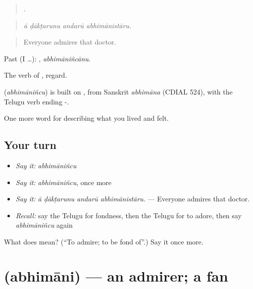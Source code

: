 \begin{quote}
   .
\end{quote}

\begin{quote}
\emph{ā ḍākṭarunu andarū abhimānistāru.}
\end{quote}

\begin{quote}
Everyone admires that doctor.
\end{quote}

Past (I …): , \emph{abhimāniñcānu}.

The verb of , regard.

\begin{cousinweb}
\textbf{} (\emph{abhimāniñcu}) is built on , from Sanskrit \emph{abhimāna} (CDIAL 524), with the Telugu verb ending -.
\end{cousinweb}

\begin{grammarlens}[title={What you've built}]
One more word for describing what you lived and felt.
\end{grammarlens}

\subsection*{Your turn}
\begin{itemize}
\raggedright
  \item \emph{Say it:} \emph{abhimāniñcu}
  \item \emph{Say it:} \emph{abhimāniñcu}, once more
  \item \emph{Say it:} \emph{ā ḍākṭarunu andarū abhimānistāru.} — Everyone admires that doctor.
  \item \emph{Recall:} say the Telugu for fondness, then the Telugu for to adore, then say \emph{abhimāniñcu} again
\end{itemize}

\begin{tcolorbox}[breakable,colback=teal!4,colframe=teal!35!black,title={Before you move on}]
What does  mean? (\textquotedblleft{}To admire; to be fond of\textquotedblright{}.) Say it once more.
\end{tcolorbox}
\section[\texorpdfstring{\te{అభిమాని} (abhimāni)}{అభిమాని (abhimāni)}]{ (abhimāni) — an admirer; a fan}

